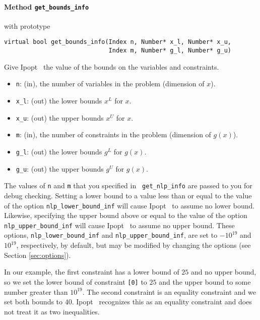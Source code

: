 \documentclass[10pt]{article}
\newcommand{\Ipopt}{{\sc Ipopt }}
\begin{document}
\paragraph{Method {\texttt{get\_bounds\_info}}} with prototype
\begin{verbatim}
virtual bool get_bounds_info(Index n, Number* x_l, Number* x_u,
                             Index m, Number* g_l, Number* g_u)
\end{verbatim}
Give \Ipopt\ the value of the bounds on the variables and constraints.
\begin{itemize}
\item {\tt n}: (in), the number of variables in the problem (dimension of $x$). 
\item {\tt x\_l}: (out) the lower bounds $x^L$ for $x$. 
\item {\tt x\_u}: (out) the upper bounds $x^U$ for $x$.
\item {\tt m}: (in), the number of constraints in the problem (dimension of $g(x)$).
\item {\tt g\_l}: (out) the lower bounds $g^L$ for $g(x)$. 
\item {\tt g\_u}: (out) the upper bounds $g^U$ for $g(x)$.
\end{itemize}
The values of {\tt n} and {\tt m} that you specified in {\tt
  get\_nlp\_info} are passed to you for debug checking.  Setting a
lower bound to a value less than or equal to the value of the option
{\tt nlp\_lower\_bound\_inf} will cause \Ipopt\ to assume no lower
bound. Likewise, specifying the upper bound above or equal to the
value of the option {\tt nlp\_upper\_bound\_inf} will cause \Ipopt\ to
assume no upper bound.  These options, {\tt nlp\_lower\_bound\_inf}
and {\tt nlp\_upper\_bound\_inf}, are set to $-10^{19}$ and $10^{19}$,
respectively, by default, but may be modified by changing the options
(see Section \ref{sec:options}).

In our example, the first constraint has a lower bound of $25$ and no upper
bound, so we set the lower bound of constraint {\tt [0]} to $25$ and
the upper bound to some number greater than $10^{19}$. The second
constraint is an equality constraint and we set both bounds to
$40$. \Ipopt\ recognizes this as an equality constraint and does not
treat it as two inequalities.
\end{document}
